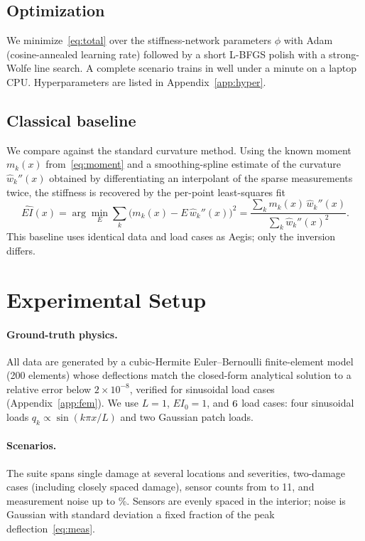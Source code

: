 \documentclass[11pt]{article}
\newcommand{\EI}{\mathit{EI}}
\begin{document}
\subsection{Optimization}
We minimize~\eqref{eq:total} over the stiffness-network parameters $\phi$ with Adam
(cosine-annealed learning rate) followed by a short L-BFGS polish with a
strong-Wolfe line search. A complete scenario trains in well under a minute on a
laptop CPU. Hyperparameters are listed in Appendix~\ref{app:hyper}.

\subsection{Classical baseline}
We compare against the standard curvature method. Using the known moment
$m_k(x)$ from~\eqref{eq:moment} and a smoothing-spline estimate of the curvature
$\hat w_k''(x)$ obtained by differentiating an interpolant of the sparse
measurements twice, the stiffness is recovered by the per-point least-squares fit
\begin{equation}
  \widehat{\EI}(x) = \arg\min_{E}\sum_k\bigl(m_k(x)-E\,\hat w_k''(x)\bigr)^2
  = \frac{\sum_k m_k(x)\,\hat w_k''(x)}{\sum_k \hat w_k''(x)^2}.
\end{equation}
This baseline uses identical data and load cases as Aegis; only the inversion
differs.

\section{Experimental Setup}
\paragraph{Ground-truth physics.} All data are generated by a cubic-Hermite
Euler--Bernoulli finite-element model (200 elements) whose deflections match the
closed-form analytical solution to a relative error below $2\times10^{-8}$,
verified for sinusoidal load cases (Appendix~\ref{app:fem}). We use $L=1$,
$\EI_0=1$, and $6$ load cases: four sinusoidal loads
$q_k\propto\sin(k\pi x/L)$ and two Gaussian patch loads.

\paragraph{Scenarios.} The suite spans single damage at several locations and
severities, two-damage cases (including closely spaced damage), sensor counts
from \minsensors{} to 11, and measurement noise up to \worstnoise\%. Sensors are
evenly spaced in the interior; noise is Gaussian with standard deviation a fixed
fraction of the peak deflection~\eqref{eq:meas}.
\end{document}
